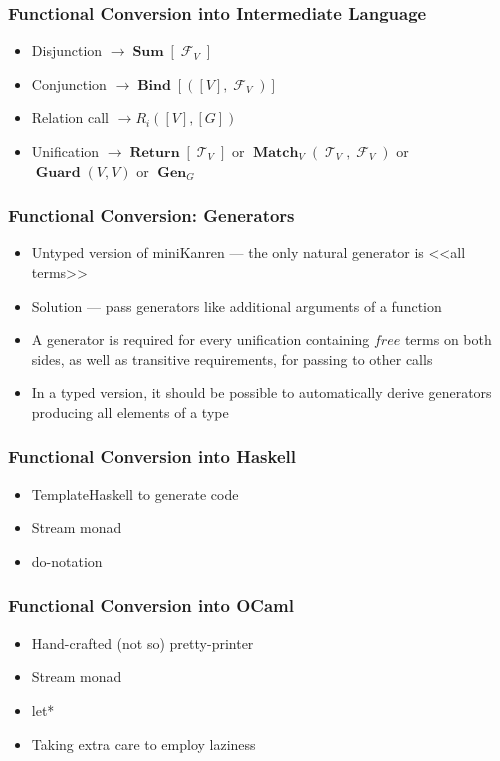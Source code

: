 \documentclass[xcolor=table]{beamer}
\DeclareMathOperator{\Term}{\mathcal{T}}
\DeclareMathOperator{\Fun}{\mathcal{F}}
\DeclareMathOperator{\Rtrn}{\mathbf{Return}}
\DeclareMathOperator{\Bind}{\mathbf{Bind}}
\DeclareMathOperator{\Match}{\mathbf{Match}}
\DeclareMathOperator{\Sum}{\mathbf{Sum}}
\DeclareMathOperator{\Guard}{\mathbf{Guard}}
\DeclareMathOperator{\Gen}{\mathbf{Gen}}
\newcommand{\LIST}[1]{\left[ #1 \right]}
\begin{document}
\begin{frame}[fragile]
  \frametitle{Functional Conversion into Intermediate Language}
\begin{itemize}
  \item Disjunction $\rightarrow \Sum\LIST{\Fun_{V}}$
  \item Conjunction $\rightarrow \Bind\LIST{\left(\LIST{V}, \Fun_{V}\right)}$
  \item Relation call $\rightarrow R_{i}(\LIST{V}, \LIST{G})$
  \item Unification $\rightarrow \Rtrn \LIST{\Term_{V}}$ or $\Match_{V} \left( \Term_{V}, \Fun_{V} \right)$ or $\Guard\left( V, V \right)$ or $\Gen_{G}$
\end{itemize}
\end{frame}
\begin{frame}[fragile]
    \frametitle{Functional Conversion: Generators}
    \begin{itemize}
        \item Untyped version of miniKanren --- the only natural generator is <<all terms>>
        \item Solution --- pass generators like additional arguments of a function
    \end{itemize}
  
\end{frame}
\begin{frame}[fragile]
    \begin{itemize}
        \item A generator is required for every unification containing $free$ terms on both sides, as well as transitive requirements, for passing to other calls
        \item In a typed version, it should be possible to automatically derive generators producing all elements of a type
    \end{itemize}
    
\end{frame}
\begin{frame}[fragile]
  \frametitle{Functional Conversion into Haskell}
  \begin{itemize}
    \item TemplateHaskell to generate code
    \item Stream monad
    \item do-notation
  \end{itemize}
\end{frame}

\begin{frame}[fragile]
  \frametitle{Functional Conversion into OCaml}
  \begin{itemize}
    \item Hand-crafted (not so) pretty-printer
    \item Stream monad
    \item let*
    \item Taking extra care to employ laziness
  \end{itemize}
\end{frame}
\end{document}
